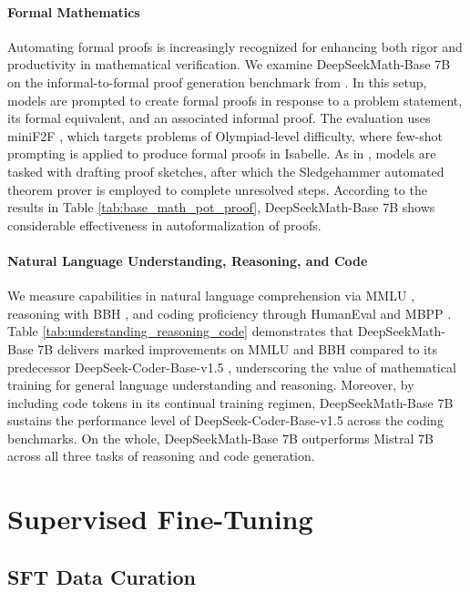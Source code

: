 \paragraph{Formal Mathematics}

Automating formal proofs is increasingly recognized for enhancing both rigor and productivity in mathematical verification. We examine DeepSeekMath-Base 7B on the informal-to-formal proof generation benchmark from \citep{dsp_proof}. In this setup, models are prompted to create formal proofs in response to a problem statement, its formal equivalent, and an associated informal proof. The evaluation uses miniF2F \citep{minif2f}, which targets problems of Olympiad-level difficulty, where few-shot prompting is applied to produce formal proofs in Isabelle. As in \cite{dsp_proof}, models are tasked with drafting proof sketches, after which the Sledgehammer automated theorem prover \citep{sledgehammer} is employed to complete unresolved steps. According to the results in Table \ref{tab:base_math_pot_proof}, DeepSeekMath-Base 7B shows considerable effectiveness in autoformalization of proofs.

\paragraph{Natural Language Understanding, Reasoning, and Code}

We measure capabilities in natural language comprehension via MMLU \citep{mmlu}, reasoning with BBH \citep{bbh}, and coding proficiency through HumanEval \citep{codex} and MBPP \citep{mbpp}. Table \ref{tab:understanding_reasoning_code} demonstrates that DeepSeekMath-Base 7B delivers marked improvements on MMLU and BBH compared to its predecessor DeepSeek-Coder-Base-v1.5 \citep{deepseek-coder}, underscoring the value of mathematical training for general language understanding and reasoning. Moreover, by including code tokens in its continual training regimen, DeepSeekMath-Base 7B sustains the performance level of DeepSeek-Coder-Base-v1.5 across the coding benchmarks. On the whole, DeepSeekMath-Base 7B outperforms Mistral 7B \citep{mistral} across all three tasks of reasoning and code generation.

\section{Supervised Fine-Tuning}

\subsection{SFT Data Curation}

